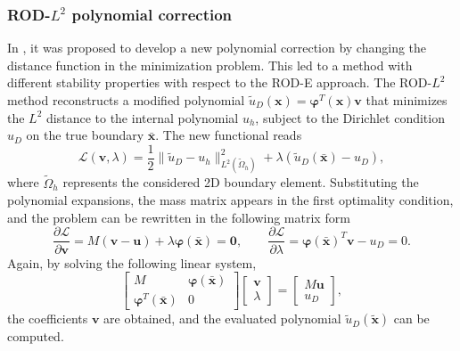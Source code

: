 \documentclass{article}
\renewcommand{\phi}{\varphi}
\begin{document}
\subsubsection{ROD-\texorpdfstring{$L^2$}{L2} polynomial correction}

In \cite{ciallella2025minimization}, it was proposed to develop a new polynomial correction by changing the distance function in the minimization problem. This led to a method with different stability properties with respect to the ROD-E approach. The ROD-$L^2$ method reconstructs a modified polynomial $\tilde u_D(\boldsymbol{x})=\boldsymbol{\phi}^T (\boldsymbol{x})\boldsymbol{v}$ that minimizes the $L^2$ distance to the internal polynomial $u_h$, subject to the Dirichlet condition $u_D$ on the true boundary $\bar{\boldsymbol{x}}$. The new functional reads
\begin{equation}
    \mathcal{L}(\boldsymbol{v}, \lambda) = \frac{1}{2} \|\tilde u_D - u_h\|^2_{L^2(\tilde \Omega_h)} + \lambda(\tilde u_D(\bar{\boldsymbol{x}}) - u_D),
\end{equation}
where $\tilde \Omega_h$ represents the considered 2D boundary element. Substituting the polynomial expansions, the mass matrix appears in the first optimality condition, and the problem can be rewritten in the following matrix form
\begin{equation}
\frac{\partial \mathcal{L}}{\partial \boldsymbol{v}} = M(\boldsymbol{v} - \boldsymbol{u}) + \lambda \boldsymbol{\phi}(\bar{\boldsymbol{x}}) = \boldsymbol{0},  \qquad \frac{\partial \mathcal{L}}{\partial \lambda} = \boldsymbol{\phi}(\bar{\boldsymbol{x}})^T \boldsymbol{v} - u_D = 0 .
\end{equation}
Again, by solving the following linear system, 
\begin{equation}\label{eq:RODL2system}
\begin{bmatrix} M & \boldsymbol{\phi}(\bar{\boldsymbol{x}}) \\ \boldsymbol{\phi}^T(\bar{\boldsymbol{x}}) & 0 \end{bmatrix} \begin{bmatrix}\boldsymbol{v} \\ \lambda \end{bmatrix} = \begin{bmatrix} M \boldsymbol{u} \\ u_D \end{bmatrix}, 
\end{equation}
the coefficients $\boldsymbol{v}$ are obtained, and the evaluated polynomial $\tilde u_D(\tilde{\boldsymbol{x}})$ can be computed.
\end{document}
